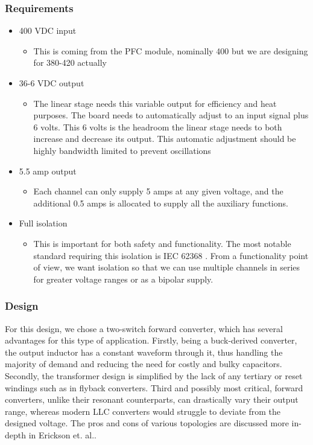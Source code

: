 \documentclass[15pt]{article}
\begin{document}
\subsubsection{Requirements}
\begin{itemize}
\item 400 VDC input \begin{itemize}
    \item This is coming from the PFC module, nominally 400 but we are designing for 380-420 actually
\end{itemize}
\item 36-6 VDC output \begin{itemize}
    \item The linear stage needs this variable output for efficiency and heat purposes. The board needs to automatically adjust to an input signal plus 6 volts. This 6 volts is the headroom the linear stage needs to both increase and decrease its output. This automatic adjustment should be highly bandwidth limited to prevent oscillations
\end{itemize}
\item 5.5 amp output \begin{itemize}
    \item Each channel can only supply 5 amps at any given voltage, and the additional 0.5 amps is allocated to supply all the auxiliary functions.

\end{itemize}
\item Full isolation \begin{itemize}
    \item This is important for both safety and functionality. The most notable standard requiring this isolation is IEC 62368 \cite{5}. From a functionality point of view, we want isolation so that we can use multiple channels in series for greater voltage ranges or as a bipolar supply.
\end{itemize}
\end{itemize}
\subsubsection{Design} 
For this design, we chose a two-switch forward converter, which has several advantages for this type of application. Firstly, being a buck-derived converter, the output inductor has a constant waveform through it, thus handling the majority of demand and reducing the need for costly and bulky capacitors. Secondly, the transformer design is simplified by the lack of any tertiary or reset windings such as in flyback converters. Third and possibly most critical, forward converters, unlike their resonant counterparts, can drastically vary their output range, whereas modern LLC converters would struggle to deviate from the designed voltage.  The pros and cons of various topologies are discussed more in-depth in Erickson et. al.\cite{2}.
\end{document}
